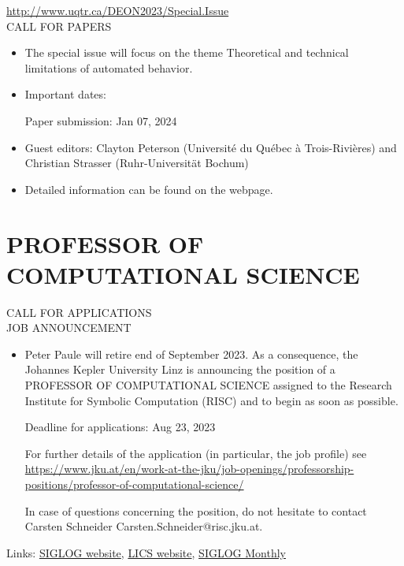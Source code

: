 \documentclass[prodmode,acmtecs]{acmsmall} %
\begin{document}
  \href{http://www.uqtr.ca/DEON2023/Special.Issue}{http://www.uqtr.ca/DEON2023/Special.Issue}\\ 
CALL FOR PAPERS 

\begin{itemize}\item  The special issue will focus on the theme Theoretical and technical limitations of automated behavior. 
 
\item  Important dates: 
 
Paper submission: Jan 07, 2024 
 
\item  Guest editors: Clayton Peterson (Université du Québec à Trois-Rivières) and Christian Strasser (Ruhr-Universität Bochum) 
 
\item  Detailed information can be found on the webpage. 
 
\end{itemize}\section{PROFESSOR OF COMPUTATIONAL SCIENCE}\label{PROFESSOROFCOMPUTATIONALSCIENCE}  CALL FOR APPLICATIONS\\ 
JOB ANNOUNCEMENT 

\begin{itemize}\item  Peter Paule will retire end of September 2023. As a consequence, the Johannes Kepler University Linz is announcing the position of a PROFESSOR OF COMPUTATIONAL SCIENCE assigned to the Research Institute for Symbolic Computation (RISC) and to begin as soon as possible. 
 
Deadline for applications: Aug 23, 2023 
 
  For further details of the application (in particular, the job profile) see \href{https://www.jku.at/en/work-at-the-jku/job-openings/professorship-positions/professor-of-computational-science/}{https://www.jku.at/en/work-at-the-jku/job-openings/professorship-positions/professor-of-computational-science/} 
 
  In case of questions concerning the position, do not hesitate to contact Carsten Schneider Carsten.Schneider@risc.jku.at.  
 
\end{itemize}


\bigskip Links: \href{http://siglog.org/}{SIGLOG website}, \href{https://lics.siglog.org}{LICS website}, \href{https://lics.siglog.org/newsletters/}{SIGLOG Monthly}
\end{document}
